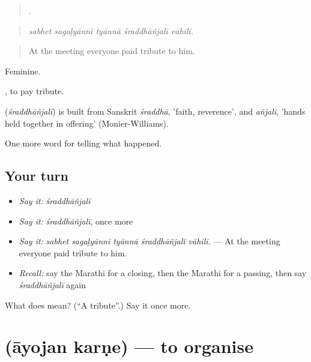 \begin{quote}
    .
\end{quote}

\begin{quote}
\emph{sabhet sagaḷyānnī tyānnā śraddhāñjalī vāhilī.}
\end{quote}

\begin{quote}
At the meeting everyone paid tribute to him.
\end{quote}

Feminine.

 , to pay tribute.

\begin{cousinweb}
\textbf{} (\emph{śraddhāñjalī}) is built from Sanskrit \emph{śraddhā}, 'faith, reverence', and \emph{añjali}, 'hands held together in offering' (Monier-Williams).
\end{cousinweb}

\begin{grammarlens}[title={What you've built}]
One more word for telling what happened.
\end{grammarlens}

\subsection*{Your turn}
\begin{itemize}
\raggedright
  \item \emph{Say it:} \emph{śraddhāñjalī}
  \item \emph{Say it:} \emph{śraddhāñjalī}, once more
  \item \emph{Say it:} \emph{sabhet sagaḷyānnī tyānnā śraddhāñjalī vāhilī.} — At the meeting everyone paid tribute to him.
  \item \emph{Recall:} say the Marathi for a closing, then the Marathi for a passing, then say \emph{śraddhāñjalī} again
\end{itemize}

\begin{tcolorbox}[breakable,colback=teal!4,colframe=teal!35!black,title={Before you move on}]
What does  mean? (\textquotedblleft{}A tribute\textquotedblright{}.) Say it once more.
\end{tcolorbox}
\section[\texorpdfstring{\mr{आयोजन} \mr{करणे} (āyojan karṇe)}{आयोजन करणे (āyojan karṇe)}]{  (āyojan karṇe) — to organise}

